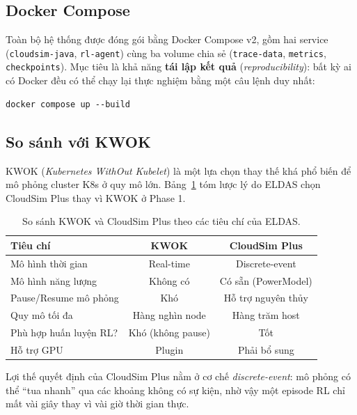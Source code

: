 \subsection{Docker Compose}
Toàn bộ hệ thống được đóng gói bằng Docker Compose v2, gồm hai service
(\texttt{cloudsim-java}, \texttt{rl-agent}) cùng ba volume chia sẻ
(\texttt{trace-data}, \texttt{metrics}, \texttt{checkpoints}). Mục tiêu
là khả năng \textbf{tái lập kết quả} (\textit{reproducibility}): bất
kỳ ai có Docker đều có thể chạy lại thực nghiệm bằng một câu lệnh duy
nhất:
\begin{lstlisting}[style=yamlstyle, caption={Khởi chạy hệ thống.}, label={lst:run}]
docker compose up --build
\end{lstlisting}

\subsection{So sánh với KWOK}
KWOK (\textit{Kubernetes WithOut Kubelet}) là một lựa chọn thay thế khá
phổ biến để mô phỏng cluster K8s ở quy mô lớn.
Bảng~\ref{tab:kwok-vs-cloudsim} tóm lược lý do ELDAS chọn CloudSim Plus
thay vì KWOK ở Phase 1.

\begin{table}[H]
  \centering
  \caption{So sánh KWOK và CloudSim Plus theo các tiêu chí của ELDAS.}
  \label{tab:kwok-vs-cloudsim}
  \small
  \begin{tabular}{lcc}
    \toprule
    \textbf{Tiêu chí} & \textbf{KWOK} & \textbf{CloudSim Plus} \\
    \midrule
    Mô hình thời gian       & Real-time         & Discrete-event \\
    Mô hình năng lượng      & Không có          & Có sẵn (PowerModel) \\
    Pause/Resume mô phỏng   & Khó               & Hỗ trợ nguyên thủy \\
    Quy mô tối đa           & Hàng nghìn node   & Hàng trăm host \\
    Phù hợp huấn luyện RL?  & Khó (không pause) & Tốt \\
    Hỗ trợ GPU              & Plugin            & Phải bổ sung \\
    \bottomrule
  \end{tabular}
\end{table}

Lợi thế quyết định của CloudSim Plus nằm ở cơ chế
\textit{discrete-event}: mô phỏng có thể ``tua nhanh'' qua các khoảng
không có sự kiện, nhờ vậy một episode RL chỉ mất vài giây thay vì vài
giờ thời gian thực.

